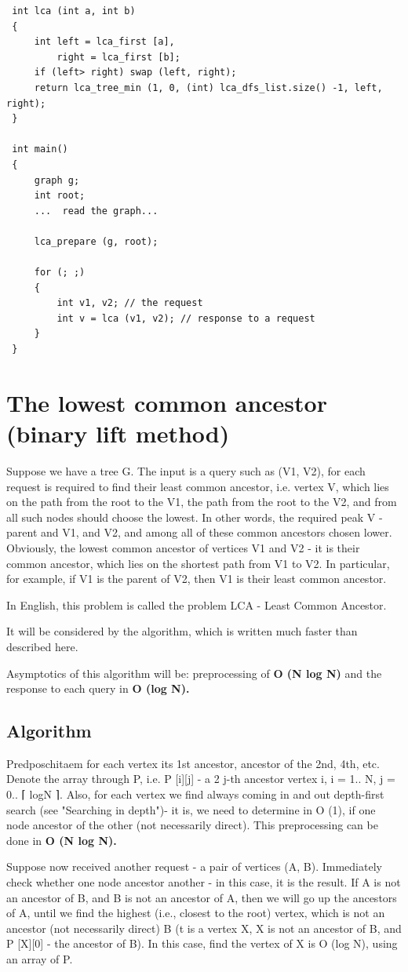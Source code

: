 \begin{verbatim}
 int lca (int a, int b)
 {
     int left = lca_first [a],
         right = lca_first [b];
     if (left> right) swap (left, right);
     return lca_tree_min (1, 0, (int) lca_dfs_list.size() -1, left, right);
 }

 int main()
 {
     graph g;
     int root;
     ...  read the graph...

     lca_prepare (g, root);

     for (; ;)
     {
         int v1, v2; // the request
         int v = lca (v1, v2); // response to a request
     }
 } 
\end{verbatim}
\section{ The lowest common ancestor (binary lift method) }
Suppose we have a tree G. The input is a query such as (V1, V2), for each request is required to find their least common ancestor, i.e. vertex V, which lies on the path from the root to the V1, the path from the root to the V2, and from all such nodes should choose the lowest. In other words, the required peak V - parent and V1, and V2, and among all of these common ancestors chosen lower. Obviously, the lowest common ancestor of vertices V1 and V2 - it is their common ancestor, which lies on the shortest path from V1 to V2. In particular, for example, if V1 is the parent of V2, then V1 is their least common ancestor.

In English, this problem is called the problem LCA - Least Common Ancestor.

It will be considered by the algorithm, which is written much faster than described here.

Asymptotics of this algorithm will be: preprocessing of \textbf{O (N log N)} and the response to each query in \textbf{O (log N).}

\subsection{ Algorithm }
Predposchitaem for each vertex its 1st ancestor, ancestor of the 2nd, 4th, etc. Denote the array through P, i.e. P [i][j] - a 2 j-th ancestor vertex i, i = 1.. N, j = 0.. ⌈ logN ⌉. Also, for each vertex we find always coming in and out depth-first search (see "Searching in depth")- it is, we need to determine in O (1), if one node ancestor of the other (not necessarily direct). This preprocessing can be done in \textbf{O (N log N).}

Suppose now received another request - a pair of vertices (A, B). Immediately check whether one node ancestor another - in this case, it is the result. If A is not an ancestor of B, and B is not an ancestor of A, then we will go up the ancestors of A, until we find the highest (i.e., closest to the root) vertex, which is not an ancestor (not necessarily direct) B (t is a vertex X, X is not an ancestor of B, and P [X][0] - the ancestor of B). In this case, find the vertex of X is O (log N), using an array of P.

